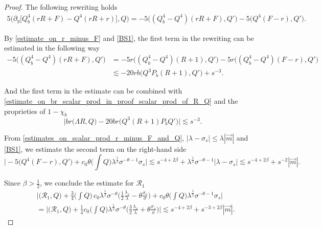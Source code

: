 \documentclass[16pt,english, oneside,reqno]{smfart}
\begin{document}
\begin{proof}
The following rewriting holds
\begin{equation}
    \begin{split}
        5 \big( \partial_y\big[ Q^4_b(rR+F)-Q^4(rR+r) \big], Q \big) = -5\big( (Q^4_b - Q^4)(rR+F), Q' \big) - 5\big( Q^4(F-r), Q' \big).
    \end{split}
\end{equation}

By \eqref{estimate_on_r_minus_F} and \eqref{BS1}, the first term in the rewriting can be estimated in the following way
\begin{equation}
\begin{split}
    -5\big( (Q^4_b - Q^4)(rR+F), Q' \big) 
    & = -5r\big( (Q^4_b - Q^4 )(R+1),Q' \big) - 5r \big( (Q^4_b - Q^4)(F-r),Q' \big)\\
    & \lesssim -20rb \big( Q^3P_b(R+1), Q' \big) + s^{-3}.
\end{split}
\end{equation}

And the first term in the estimate can be combined with \eqref{estimate_on_br_scalar_prod_in_proof_scalar_prod_of_R_Q} and the proprieties of $1-\chi_b$
\begin{equation}
    \big| br\big( \Lambda R, Q \big) - 20 br \big( Q^3(R+1)P_bQ' \big)\big| \lesssim s^{-3}.
\end{equation}

From \eqref{estimates_on_scalar_prod_r_minus_F_and_Q}, $|\lambda- \sigma_s| \leq \lambda |\vec{m}|$ and \eqref{BS1}, we estimate the second term on the right-hand side
\begin{equation}
    \bigg\lvert - 5\big( Q^4(F-r), Q' \big) + c_0 \theta \Big( \int Q\Big) \lambda^{\frac{1}{2}}\sigma^{-\theta-1}\sigma_s \bigg\rvert \lesssim s^{-4+2\beta} + \lambda^{\frac{1}{2}}\sigma^{-\theta-1}|\lambda - \sigma_s|\lesssim s^{-4+2\beta}+s^{-2}|\vec{m}|.
\end{equation}

Since $\beta>\frac{1}{2}$, we conclude the estimate for $\mathcal{R}_1$
\begin{equation}
\begin{split}
    & \bigg\lvert \big( \mathcal{R}_1,Q\big) +\frac{3}{4}\Big(\int Q\Big)\, c_0 \lambda^{\frac{1}{2}}\sigma^{-\theta}\Big( \frac{1}{2}\frac{\lambda_s}{\lambda} - \theta \frac{\sigma_s}{\sigma}\Big) + c_0 \theta \Big( \int Q\Big) \lambda^{\frac{1}{2}}\sigma^{-\theta-1}\sigma_s \bigg\rvert\\
    & =
    \bigg\lvert \big( \mathcal{R}_1,Q\big) + \frac{1}{4}c_0 \Big( \int Q\Big) \lambda^{\frac{1}{2}} \sigma^{-\theta} \Big(\frac{3}{2}\frac{\lambda_s}{\lambda} + \theta \frac{\sigma_s}{\sigma} \Big) \bigg\rvert \lesssim s^{-4+2\beta} + s^{-3+2\beta}|\vec{m}|.
\end{split}
\end{equation}


\end{proof}
\end{document}
